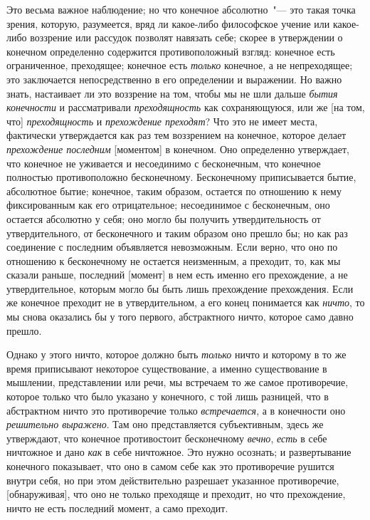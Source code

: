 Это весьма важное наблюдение; но что конечное
абсолютно~"--- это такая точка зрения, которую, разумеется,
вряд ли какое-либо философское учение или какое-либо
воззрение или рассудок позволят навязать себе;
скорее в утверждении о конечном определенно содержится
противоположный взгляд: конечное есть ограниченное,
преходящее; конечное есть \emph{только} конечное, а не непреходящее;
это заключается непосредственно в его определении
и выражении. Но важно знать, настаивает ли это
воззрение на том, чтобы мы не шли дальше \emph{бытия конечности}
и рассматривали \emph{преходящность} как сохраняющуюся,
или же [на том, что] \emph{преходящность} и \emph{прехождение
преходят}? Что это не имеет места, фактически утверждается
как раз тем воззрением на конечное, которое
делает \emph{прехождение последним} [моментом] в конечном.
Оно определенно утверждает, что конечное не уживается
и несоединимо с бесконечным, что конечное полностью
противоположно бесконечному. Бесконечному приписывается
бытие, абсолютное бытие; конечное, таким
образом, остается по отношению к нему фиксированным
как его отрицательное; несоединимое с бесконечным, оно
остается абсолютно у себя; оно могло бы получить утвердительность
от утвердительного, от бесконечного и таким
образом оно прешло бы; но как раз соединение с последним
объявляется невозможным. Если верно, что оно по
отношению к бесконечному не остается неизменным, а
преходит, то, как мы сказали раньше, последний [момент]
в нем есть именно его прехождение, а не утвердительное,
которым могло бы быть лишь прехождение прехождения.
Если же конечное преходит не в утвердительном, а его конец
понимается как \emph{ничто}, то мы снова оказались бы у того
первого, абстрактного ничто, которое само давно прешло.

Однако у этого ничто, которое должно быть \emph{только}
ничто и которому в то же время приписывают некоторое
существование, а именно существование в мышлении,
представлении или речи, мы встречаем то же самое противоречие,
которое только что было указано у конечного,
с той лишь разницей, что в абстрактном ничто это противоречие
только \emph{встречается}, а в конечности оно \emph{решительно
выражено}. Там оно представляется субъективным,
здесь же утверждают, что конечное противостоит бесконечному
\emph{вечно}, \emph{есть} в себе ничтожное и дано \emph{как} в себе
ничтожное. Это нужно осознать; и развертывание конечного
показывает, что оно в самом себе как это противоречие
рушится внутри себя, но при этом действительно
разрешает указанное противоречие, [обнаруживая], что
оно не только преходяще и преходит, но что прехождение,
ничто не есть последний момент, а само преходит.


